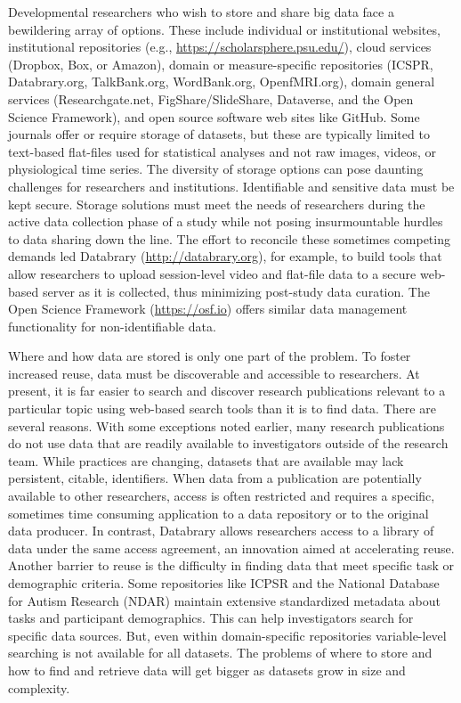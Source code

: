 \documentclass[letterpaper,man,apacite]{apa6}
\begin{document}
Developmental researchers who wish to store and share big data face a bewildering array of options.
These include individual or institutional websites, institutional repositories (e.g., \url{https://scholarsphere.psu.edu/}), cloud services (Dropbox, Box, or Amazon), domain or measure-specific repositories (ICSPR, Databrary.org, TalkBank.org, WordBank.org, OpenfMRI.org), domain general services (Researchgate.net, FigShare/SlideShare, Dataverse, and the Open Science Framework), and open source software web sites like GitHub.
Some journals offer or require storage of datasets, but these are typically limited to text-based flat-files used for statistical analyses and not raw images, videos, or physiological time series.
The diversity of storage options can pose daunting challenges for researchers and institutions.
Identifiable and sensitive data must be kept secure.
Storage solutions must meet the needs of researchers during the active data collection phase of a study while not posing insurmountable hurdles to data sharing down the line.
The effort to reconcile these sometimes competing demands led Databrary (\url{http://databrary.org}), for example, to build tools that allow researchers to upload session-level video and flat-file data to a secure web-based server as it is collected, thus minimizing post-study data curation.
The Open Science Framework (\url{https://osf.io}) offers similar data management functionality for non-identifiable data.

Where and how data are stored is only one part of the problem.
To foster increased reuse, data must be discoverable and accessible to researchers.
At present, it is far easier to search and discover research publications relevant to a particular topic using web-based search tools than it is to find data.
There are several reasons.
With some exceptions noted earlier, many research publications do not use data that are readily available to investigators outside of the research team.
While practices are changing, datasets that are available may lack persistent, citable, identifiers.
When data from a publication are potentially available to other researchers, access is often restricted and requires a specific, sometimes time consuming application to a data repository or to the original data producer.
In contrast, Databrary allows researchers access to a library of data under the same access agreement, an innovation aimed at accelerating reuse.
Another barrier to reuse is the difficulty in finding data that meet specific task or demographic criteria.
Some repositories like ICPSR and the National Database for Autism Research (NDAR) maintain extensive standardized metadata about tasks and participant demographics.
This can help investigators search for specific data sources.
But, even within domain-specific repositories variable-level searching is not available for all datasets.
The problems of where to store and how to find and retrieve data will get bigger as datasets grow in size and complexity.
\end{document}
